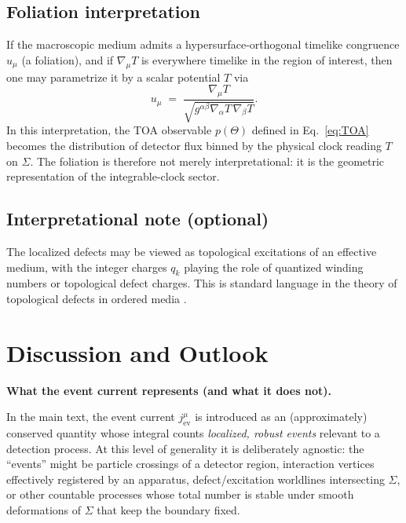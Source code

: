 \documentclass[11pt, a4paper]{article}
\theoremstyle{definition}
\theoremstyle{plain}
\theoremstyle{remark}
\numberwithin{equation}{section}
\begin{document}
    \subsection{Foliation interpretation}
        
        If the macroscopic medium admits a hypersurface-orthogonal timelike congruence $u_\mu$ (a foliation), and if $\nabla_\mu T$ is everywhere timelike in the region of interest, then one may parametrize it by a scalar potential $T$ via
        \begin{equation}
            u_\mu \;=\;\frac{\nabla_\mu T}{\sqrt{g^{\alpha\beta}\nabla_\alpha T\,\nabla_\beta T}}.
            \label{eq:uFromT}
        \end{equation}
        In this interpretation, the TOA observable $p(\Theta)$ defined in Eq.~\eqref{eq:TOA} becomes the distribution of detector flux binned by the physical clock reading $T$ on $\Sigma$. The foliation is therefore not merely interpretational: it is the geometric representation of the integrable-clock sector.
    
    \subsection{Interpretational note (optional)}
        
        The localized defects may be viewed as topological excitations of an effective medium, with the integer charges $q_k$ playing the role of quantized winding numbers or topological defect charges. This is standard language in the theory of topological defects in ordered media \cite{Peskin1995,Weinberg1995}.

    \section{Discussion and Outlook}\label{sec:discussion}
    
    \medskip\noindent\textbf{What the event current represents (and what it does not).}\par
        In the main text, the event current $j^\mu_{\mathrm{ev}}$ is introduced as an (approximately) conserved quantity whose integral counts \emph{localized, robust events} relevant to a detection process. At this level of generality it is deliberately agnostic: the ``events'' might be particle crossings of a detector region, interaction vertices effectively registered by an apparatus, defect/excitation worldlines intersecting $\Sigma$, or other countable processes whose total number is stable under smooth deformations of $\Sigma$ that keep the boundary fixed.
        
\end{document}
